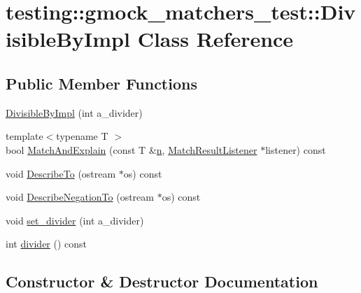 \hypertarget{classtesting_1_1gmock__matchers__test_1_1DivisibleByImpl}{}\section{testing\+:\+:gmock\+\_\+matchers\+\_\+test\+:\+:Divisible\+By\+Impl Class Reference}
\label{classtesting_1_1gmock__matchers__test_1_1DivisibleByImpl}
\subsection*{Public Member Functions}
\begin{DoxyCompactItemize}
\item 
\hyperlink{classtesting_1_1gmock__matchers__test_1_1DivisibleByImpl_aab5d8d383a8cbf112fe087c4f0f3f699}{Divisible\+By\+Impl} (int a\+\_\+divider)
\item 
{\footnotesize template$<$typename T $>$ }\\bool \hyperlink{classtesting_1_1gmock__matchers__test_1_1DivisibleByImpl_a7f2368362416d0e527f6ac0790003d69}{Match\+And\+Explain} (const T \&\hyperlink{app_2main_8cpp_acfc02ec89670db29251fda6a66602ce2}{n}, \hyperlink{classtesting_1_1MatchResultListener}{Match\+Result\+Listener} $\ast$listener) const 
\item 
void \hyperlink{classtesting_1_1gmock__matchers__test_1_1DivisibleByImpl_a6dd6430816067c5f787eb2e722c59181}{Describe\+To} (ostream $\ast$os) const 
\item 
void \hyperlink{classtesting_1_1gmock__matchers__test_1_1DivisibleByImpl_a92e618b858b39fa72b1e4a3766956884}{Describe\+Negation\+To} (ostream $\ast$os) const 
\item 
void \hyperlink{classtesting_1_1gmock__matchers__test_1_1DivisibleByImpl_a86c8787ab835bc84a9ad7e3931d644cc}{set\+\_\+divider} (int a\+\_\+divider)
\item 
int \hyperlink{classtesting_1_1gmock__matchers__test_1_1DivisibleByImpl_ac1ecf78ff1aacb98ced9eb90185e2f75}{divider} () const 
\end{DoxyCompactItemize}


\subsection{Constructor \& Destructor Documentation}
